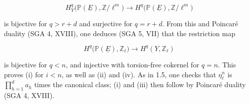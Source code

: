 \begin{equation*}
H_Y^q\bigl(\mathbb P(\underline E),\mathbb Z/\ell^m\bigr)
\longrightarrow H^q\bigl(\mathbb P(\underline E),\mathbb Z/\ell^m\bigr)
\end{equation*}


is bijective for $q>r+d$ and surjective for $q=r+d$.  From this and
Poincaré duality (SGA 4, XVIII), one deduces (SGA 5, VII) that the
restriction map

\begin{equation*}
H^q\bigl(\mathbb P(\underline E),\mathbb Z_\ell\bigr)
\longrightarrow H^q(Y,\mathbb Z_\ell)
\end{equation*}

is bijective for $q<n$, and injective with torsion-free cokernel for $q=n$.
This proves (i) for $i<n$, as well as (ii) and (iv).  As in 1.5, one checks
that $\eta_\ell^n$ is $\prod_{h=1}^d a_h$ times the canonical class; (i)
and (iii) then follow by Poincaré duality (SGA 4, XVIII).

